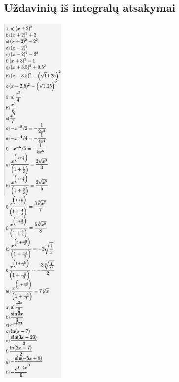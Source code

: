 \documentclass[a4paper]{article}
\begin{document}
\subsection{Uždavinių iš integralų atsakymai}
\includegraphics[width=0.23\textwidth]{int_ats.jpg}
\end{document}
